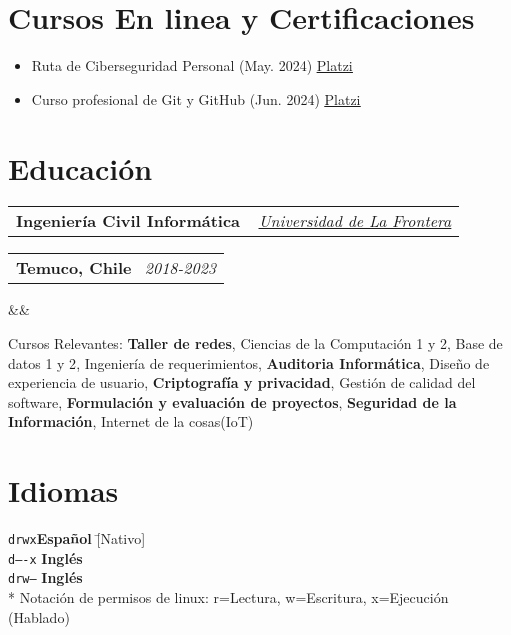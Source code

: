 \documentclass[11pt,a4paper,sans]{moderncv}
\makeatletter
\newcommand{\sectionMargin}{-3mm}
\newcommand*{\customcventry}[7][.13em]{
    \begin{tabular}{@{}l}
    {\bfseries #4} \
    {\itshape #3}
    \end{tabular}
    \hfill
    \begin{tabular}{l@{}}
    {\bfseries #5} \
    {\itshape #2}
    \end{tabular}
    \ifx&#7&%
    \else{\
    \begin{minipage}{\maincolumnwidth}%
    \small#7%
    \end{minipage}}\fi%
    \par\addvspace{#1}
}
\makeatother
\begin{document}
\vspace*{\sectionMargin}

\section{Cursos En linea y Certificaciones}{
\begin{itemize}[label=\textbullet, noitemsep]
    \item Ruta de Ciberseguridad Personal (May. 2024) \href{https://1drv.ms/b/c/13c8ae619d64655e/EZYaMe6SBhJAshtvq4ORCQoBwWMYRerI4_xiuqXjORVd0w?e=I4tLqg}{\underline{Platzi}}
    \item Curso profesional de Git y GitHub (Jun. 2024) \href{https://1drv.ms/b/c/13c8ae619d64655e/EXeQGPrTCjFDpmx8pCItVTwB-OS1r-tkKJbmgYnahuxtYg?e=mc9YcH}{\underline{Platzi}}
\end{itemize}
}

\vspace*{-6mm}

\section{Educación}{
\customcventry
    {2018-2023}
    { \href{https://1drv.ms/b/c/13c8ae619d64655e/EV5lZJ1hrsgggBOHLAAAAAABHh9OZUbWLd2nx7PTa_OSsg?e=Fedmge}{\underline{Universidad de La Frontera}} }
    {Ingeniería Civil Informática}
    {Temuco, Chile}
    {}{}
    {Cursos Relevantes: 
        \textbf{Taller de redes}, 
        {Ciencias de la Computación} 1 y 2, 
        {Base de datos 1 y 2}, 
        {Ingeniería de requerimientos},
        \textbf{Auditoria Informática}, 
        {Diseño de experiencia de usuario}, 
        \textbf{Criptografía y privacidad}, 
        Gestión de {calidad del software}, 
        \textbf{Formulación y evaluación de proyectos},
        \textbf{Seguridad de la Información},
        Internet de la cosas{(IoT)}
}
}

\vspace*{\sectionMargin}

\section{Idiomas}{
\begin{tabbing}
    \texttt{drwx}\hspace{1mm}\= \textbf{Español}    \hspace{1mm}\=  [Nativo] \\
    \texttt{d----x} \>          \textbf{Inglés}     \>              [B1] \\
    \texttt{drw--}  \>          \textbf{Inglés}     \>              [Técnico] \\
    \** Notación de permisos de linux: r=Lectura, w=Escritura, x=Ejecución (Hablado)
\end{tabbing}
}
\end{document}
